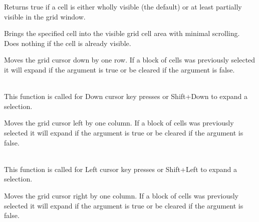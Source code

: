 
Returns true if a cell is either wholly visible (the default) or at least partially
visible in the grid window.



\label{wxgridmakecellvisible}



Brings the specified cell into the visible grid cell area with minimal scrolling. Does
nothing if the cell is already visible.



\label{wxgridmovecursordown}


Moves the grid cursor down by one row. If a block of cells was previously selected it
will expand if the argument is true or be cleared if the argument is false.

\\
This function is called for Down cursor key presses or Shift+Down to expand a selection.



\label{wxgridmovecursorleft}


Moves the grid cursor left by one column. If a block of cells was previously selected it
will expand if the argument is true or be cleared if the argument is false.

\\
This function is called for Left cursor key presses or Shift+Left to expand a selection.



\label{wxgridmovecursorright}


Moves the grid cursor right by one column. If a block of cells was previously selected it
will expand if the argument is true or be cleared if the argument is false.


